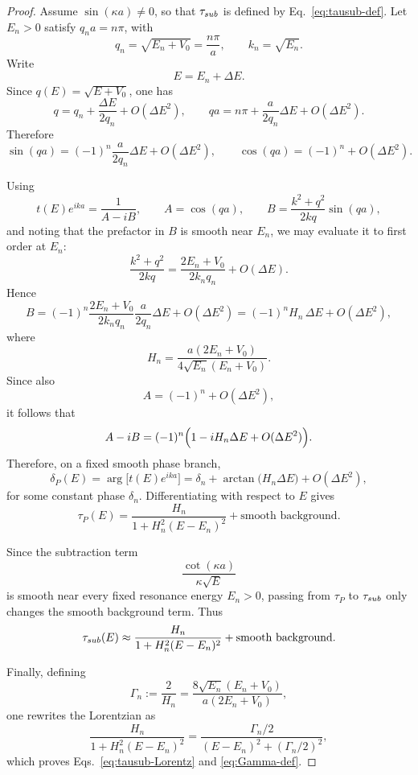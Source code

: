 \documentclass[10pt,a4paper]{amsart}
\begin{document}
\begin{proof}
Assume \(\sin(\kappa a)\neq 0\), so that \(\tau_{\rm sub}\) is defined by
Eq.~\eqref{eq:tausub-def}. Let \(E_n>0\) satisfy \(q_n a=n\pi\), with
\[
q_n=\sqrt{E_n+V_0}=\frac{n\pi}{a},
\qquad
k_n=\sqrt{E_n}.
\]
Write
\[
E=E_n+\Delta E.
\]
Since \(q(E)=\sqrt{E+V_0}\), one has
\[
q=q_n+\frac{\Delta E}{2q_n}+O(\Delta E^2),
\qquad
qa=n\pi+\frac{a}{2q_n}\Delta E+O(\Delta E^2).
\]
Therefore
\[
\sin(qa)=(-1)^n\frac{a}{2q_n}\Delta E+O(\Delta E^2),
\qquad
\cos(qa)=(-1)^n+O(\Delta E^2).
\]

Using
\[
t(E)e^{ika}=\frac{1}{A-iB},
\qquad
A=\cos(qa),
\qquad
B=\frac{k^2+q^2}{2kq}\sin(qa),
\]
and noting that the prefactor in \(B\) is smooth near \(E_n\), we may evaluate it to first order at \(E_n\):
\[
\frac{k^2+q^2}{2kq}
=
\frac{2E_n+V_0}{2k_n q_n}+O(\Delta E).
\]
Hence
\[
B=
(-1)^n\frac{2E_n+V_0}{2k_n q_n}\frac{a}{2q_n}\Delta E
+O(\Delta E^2)
=
(-1)^n H_n\,\Delta E+O(\Delta E^2),
\]
where
\[
H_n=\frac{a(2E_n+V_0)}{4\sqrt{E_n}(E_n+V_0)}.
\]
Since also
\[
A=(-1)^n+O(\Delta E^2),
\]
it follows that
\[
A-iB
=
(-1)^n\Bigl(1-iH_n\Delta E+O(\Delta E^2)\Bigr).
\]
Therefore, on a fixed smooth phase branch,
\[
\delta_P(E)
=
\arg\!\bigl[t(E)e^{ika}\bigr]
=
\delta_n+\arctan\!\bigl(H_n\Delta E\bigr)+O(\Delta E^2),
\]
for some constant phase \(\delta_n\). Differentiating with respect to \(E\)
gives
\[
\tau_P(E)
=
\frac{H_n}{1+H_n^2(E-E_n)^2}
+\text{smooth background}.
\]

Since the subtraction term
\[
\frac{\cot(\kappa a)}{\kappa\sqrt{E}}
\]
is smooth near every fixed resonance energy \(E_n>0\), passing from
\(\tau_P\) to \(\tau_{\rm sub}\) only changes the smooth background term.
Thus
\[
\tau_{\rm sub}(E)\approx
\frac{H_n}{1+H_n^2(E-E_n)^2}
+\text{smooth background}.
\]

Finally, defining
\[
\Gamma_n:=\frac{2}{H_n}
=
\frac{8\sqrt{E_n}(E_n+V_0)}{a(2E_n+V_0)},
\]
one rewrites the Lorentzian as
\[
\frac{H_n}{1+H_n^2(E-E_n)^2}
=
\frac{\Gamma_n/2}{(E-E_n)^2+(\Gamma_n/2)^2},
\]
which proves Eqs.~\eqref{eq:tausub-Lorentz} and \eqref{eq:Gamma-def}.
\end{proof}
\end{document}
